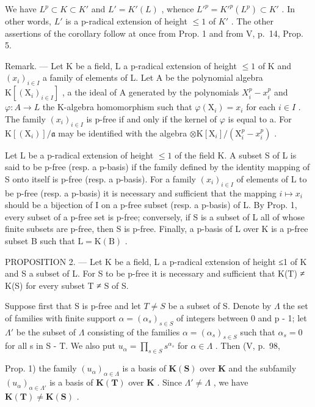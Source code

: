 We have \(L^{p} \subset K \subset K'\) and \(L' = K'(L)\) , whence \(L'^{p} = K'^{p}(L^{p}) \subset K'\) . In other words, \(L'\) is a p-radical extension of height \(\leqslant 1\) of \(K'\) . The other assertions of the corollary follow at once from Prop. 1 and from V, p.~14, Prop. 5.

Remark. --- Let K be a field, L a p-radical extension of height \(\leqslant1\) of K and \((x_{i})_{i\in I}\) a family of elements of L. Let A be the polynomial algebra \(\mathrm{K}[(\mathrm{X}_{i})_{i\in I}]\) , a the ideal of A generated by the polynomials \(X_{i}^{p}-x_{i}^{p}\) and \(\varphi:A\to L\) the K-algebra homomorphism such that \(\varphi(\mathrm{X}_{i})=x_{i}\) for each \(i\in I\) . The family \((x_{i})_{i\in I}\) is p-free if and only if the kernel of \(\varphi\) is equal to a. For \(\mathrm{K}[(\mathrm{X}_{i})]/\mathfrak{a}\) may be identified with the algebra \(\otimes\mathrm{K}[\mathrm{X}_{i}]/(\mathrm{X}_{i}^{p}-x_{i}^{p})\) .

Let L be a p-radical extension of height \(\leqslant1\) of the field K. A subset S of L is said to be p-free (resp. a p-basis) if the family defined by the identity mapping of S onto itself is p-free (resp. a p-basis). For a family \((x_{i})_{i\in I}\) of elements of L to be p-free (resp. a p-basis) it is necessary and sufficient that the mapping \(i\mapsto x_{i}\) should be a bijection of I on a p-free subset (resp. a p-basis) of L. By Prop. 1, every subset of a p-free set is p-free; conversely, if S is a subset of L all of whose finite subsets are p-free, then S is p-free. Finally, a p-basis of L over K is a p-free subset B such that \(\mathrm{L}=\mathrm{K}(\mathrm{B})\) .

PROPOSITION 2. --- Let K be a field, L a p-radical extension of height ≤1 of K and S a subset of L. For S to be p-free it is necessary and sufficient that K(T) ≠ K(S) for every subset T ≠ S of S.

Suppose first that S is p-free and let \(T \neq S\) be a subset of S. Denote by \(\Lambda\) the set of families with finite support \(\alpha = (\alpha_{s})_{s \in S}\) of integers between 0 and p - 1; let \(\Lambda'\) be the subset of \(\Lambda\) consisting of the families \(\alpha = (\alpha_{s})_{s \in S}\) such that \(\alpha_{s} = 0\) for all s in S - T. We also put \(u_{\alpha} = \prod_{s \in S} s^{\alpha_{s}}\) for \(\alpha \in \Lambda\) . Then (V, p.~98,

Prop. 1) the family \((u_{\alpha})_{\alpha \in \Lambda}\) is a basis of \(\mathbf{K}(\mathbf{S})\) over \(\mathbf{K}\) and the subfamily \((u_{\alpha})_{\alpha \in \Lambda'}\) is a basis of \(\mathbf{K}(\mathbf{T})\) over \(\mathbf{K}\) . Since \(\Lambda' \neq \Lambda\) , we have \(\mathbf{K}(\mathbf{T}) \neq \mathbf{K}(\mathbf{S})\) .

